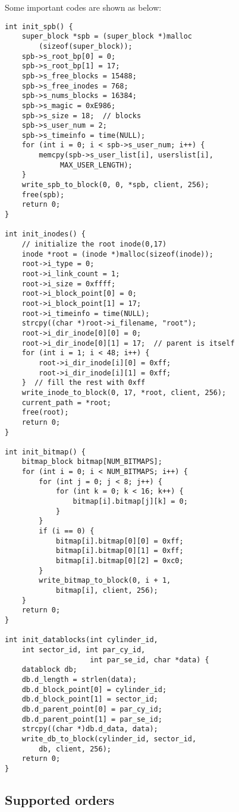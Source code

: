 \documentclass[a4paper]{article}
\begin{document}
Some important codes are shown as below:

\begin{lstlisting}
int init_spb() {
    super_block *spb = (super_block *)malloc
        (sizeof(super_block));
    spb->s_root_bp[0] = 0;
    spb->s_root_bp[1] = 17;
    spb->s_free_blocks = 15488;
    spb->s_free_inodes = 768;
    spb->s_nums_blocks = 16384;
    spb->s_magic = 0xE986;
    spb->s_size = 18;  // blocks
    spb->s_user_num = 2;
    spb->s_timeinfo = time(NULL);
    for (int i = 0; i < spb->s_user_num; i++) {
        memcpy(spb->s_user_list[i], userslist[i],
             MAX_USER_LENGTH);
    }
    write_spb_to_block(0, 0, *spb, client, 256);
    free(spb);
    return 0;
}

int init_inodes() {
    // initialize the root inode(0,17)
    inode *root = (inode *)malloc(sizeof(inode));
    root->i_type = 0;
    root->i_link_count = 1;
    root->i_size = 0xffff;
    root->i_block_point[0] = 0;
    root->i_block_point[1] = 17;
    root->i_timeinfo = time(NULL);
    strcpy((char *)root->i_filename, "root");
    root->i_dir_inode[0][0] = 0;
    root->i_dir_inode[0][1] = 17;  // parent is itself
    for (int i = 1; i < 48; i++) {
        root->i_dir_inode[i][0] = 0xff;
        root->i_dir_inode[i][1] = 0xff;
    }  // fill the rest with 0xff
    write_inode_to_block(0, 17, *root, client, 256);
    current_path = *root;
    free(root);
    return 0;
}

int init_bitmap() {
    bitmap_block bitmap[NUM_BITMAPS];
    for (int i = 0; i < NUM_BITMAPS; i++) {
        for (int j = 0; j < 8; j++) {
            for (int k = 0; k < 16; k++) {
                bitmap[i].bitmap[j][k] = 0;
            }
        }
        if (i == 0) {
            bitmap[i].bitmap[0][0] = 0xff;
            bitmap[i].bitmap[0][1] = 0xff;
            bitmap[i].bitmap[0][2] = 0xc0;
        }
        write_bitmap_to_block(0, i + 1, 
            bitmap[i], client, 256);
    }
    return 0;
}

int init_datablocks(int cylinder_id, 
    int sector_id, int par_cy_id,
                    int par_se_id, char *data) {
    datablock db;
    db.d_length = strlen(data);
    db.d_block_point[0] = cylinder_id;
    db.d_block_point[1] = sector_id;
    db.d_parent_point[0] = par_cy_id;
    db.d_parent_point[1] = par_se_id;
    strcpy((char *)db.d_data, data);
    write_db_to_block(cylinder_id, sector_id, 
        db, client, 256);
    return 0;
}
\end{lstlisting}

\subsection{Supported orders}
\end{document}
